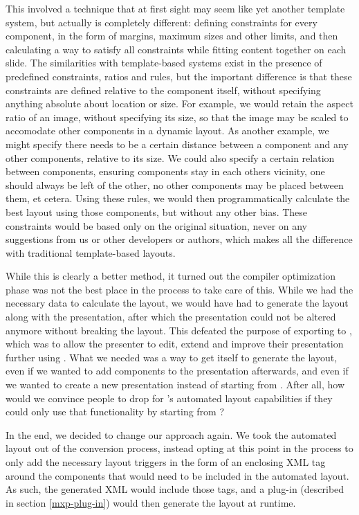    This involved a technique that at first sight may seem like yet another
   template system, but actually is completely different: defining constraints
   for every component, in the form of margins, maximum sizes and other limits,
   and then calculating a way to satisfy all constraints while fitting content
   together on each slide. The similarities with template-based systems exist
   in the presence of predefined constraints, ratios and rules, but the
   important difference is that these constraints are defined relative to the
   component itself, without specifying anything absolute about location or
   size. For example, we would retain the aspect ratio of an image, without
   specifying its size, so that the image may be scaled to accomodate other
   components in a dynamic layout. As another example, we might specify there
   needs to be a certain distance between a component and any other components,
   relative to its size. We could also specify a certain relation between
   components, ensuring components stay in each others vicinity, one should
   always be left of the other, no other components may be placed between them,
   et cetera. Using these rules, we would then programmatically calculate the best
   layout using those components, but without any other bias. These constraints
   would be based only on the original situation, never on any suggestions from
   us or other developers or authors, which makes all the difference with
   traditional template-based layouts.
 
   While this is clearly a better method, it turned out the compiler
   optimization phase was not the best place in the process to take care of
   this. While we had the necessary data to calculate the layout, we would have
   had to generate the layout along with the \mxp presentation, after which the
   presentation could not be altered anymore without breaking the layout. This
   defeated the purpose of exporting to \mxp, which was to allow the presenter
   to edit, extend and improve their presentation further using \mxp. What we
   needed was a way to get \mxp itself to generate the layout, even if we
   wanted to add components to the presentation afterwards, and even if we
   wanted to create a new \mxp presentation instead of starting from \ppt.
   After all, how would we convince people to drop \ppt for \mxp's automated
   layout capabilities if they could only use that functionality by starting
   from \ppt?

   In the end, we decided to change our approach again. We took the automated
   layout out of the conversion process, instead opting at this point in the
   process to only add the necessary layout triggers in the form of an
   enclosing XML tag around the components that would need to be included in
   the automated layout. As such, the generated \mxp XML would include those
   tags, and a plug-in (described in section \ref{mxp-plug-in}) would then
   generate the layout at runtime.
  

